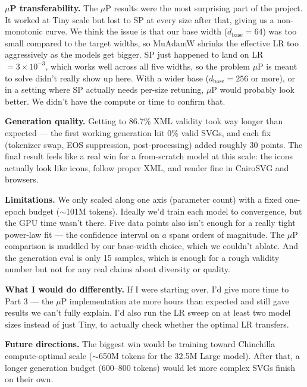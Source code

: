 \documentclass[10pt,letterpaper]{article}
\begin{document}
\textbf{$\mu$P transferability.}
The $\mu$P results were the most surprising part of the project. It worked at Tiny scale but lost to SP at every size after that, giving us a non-monotonic curve. We think the issue is that our base width ($d_\text{base} = 64$) was too small compared to the target widths, so MuAdamW shrinks the effective LR too aggressively as the models get bigger. SP just happened to land on LR $= 3 \times 10^{-3}$, which works well across all five widths, so the problem $\mu$P is meant to solve didn't really show up here. With a wider base ($d_\text{base} = 256$ or more), or in a setting where SP actually needs per-size retuning, $\mu$P would probably look better. We didn't have the compute or time to confirm that.

\textbf{Generation quality.}
Getting to 86.7\% XML validity took way longer than expected — the first working generation hit 0\% valid SVGs, and each fix (tokenizer swap, EOS suppression, post-processing) added roughly 30 points. The final result feels like a real win for a from-scratch model at this scale: the icons actually look like icons, follow proper XML, and render fine in CairoSVG and browsers.

\textbf{Limitations.}
We only scaled along one axis (parameter count) with a fixed one-epoch budget ($\sim$101M tokens). Ideally we'd train each model to convergence, but the GPU time wasn't there. Five data points also isn't enough for a really tight power-law fit — the confidence interval on $a$ spans orders of magnitude. The $\mu$P comparison is muddled by our base-width choice, which we couldn't ablate. And the generation eval is only 15 samples, which is enough for a rough validity number but not for any real claims about diversity or quality.

\textbf{What I would do differently.}
If I were starting over, I'd give more time to Part 3 — the $\mu$P implementation ate more hours than expected and still gave results we can't fully explain. I'd also run the LR sweep on at least two model sizes instead of just Tiny, to actually check whether the optimal LR transfers.

\textbf{Future directions.}
The biggest win would be training toward Chinchilla compute-optimal scale ($\sim$650M tokens for the 32.5M Large model). After that, a longer generation budget (600–800 tokens) would let more complex SVGs finish on their own.
\end{document}
